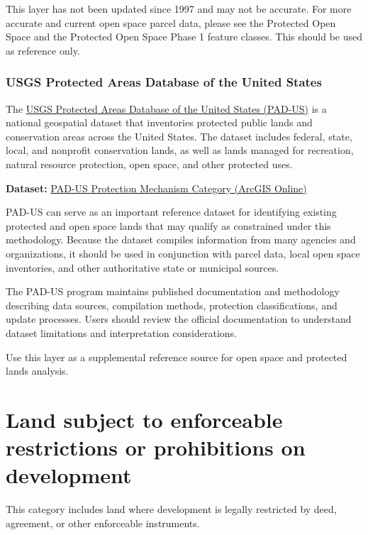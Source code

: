 \documentclass[
  letterpaper,
  DIV=11,
  numbers=noendperiod]{scrreprt}
\begin{document}
This layer has not been updated since 1997 and may not be accurate. For
more accurate and current open space parcel data, please see the
Protected Open Space and the Protected Open Space Phase 1 feature
classes. This should be used as reference only.

\subsubsection{USGS Protected Areas Database of the United
States}\label{sec-usgs-protected-areas-database-of-the-united-states}

The
\href{https://www.usgs.gov/programs/gap-analysis-project/science/pad-us-data-overview}{USGS
Protected Areas Database of the United States (PAD-US)} is a national
geospatial dataset that inventories protected public lands and
conservation areas across the United States. The dataset includes
federal, state, local, and nonprofit conservation lands, as well as
lands managed for recreation, natural resource protection, open space,
and other protected uses.

\textbf{Dataset:}
\href{https://usgs.maps.arcgis.com/home/item.html?id=80c7a138989c4cf8937c4502371d6e99}{PAD-US
Protection Mechanism Category (ArcGIS Online)}

PAD-US can serve as an important reference dataset for identifying
existing protected and open space lands that may qualify as constrained
under this methodology. Because the dataset compiles information from
many agencies and organizations, it should be used in conjunction with
parcel data, local open space inventories, and other authoritative state
or municipal sources.

The PAD-US program maintains published documentation and methodology
describing data sources, compilation methods, protection
classifications, and update processes. Users should review the official
documentation to understand dataset limitations and interpretation
considerations.

Use this layer as a supplemental reference source for open space and
protected lands analysis.

\section{Land subject to enforceable restrictions or prohibitions on
development}\label{land-subject-to-enforceable-restrictions-or-prohibitions-on-development}

This category includes land where development is legally restricted by
deed, agreement, or other enforceable instruments.
\end{document}

